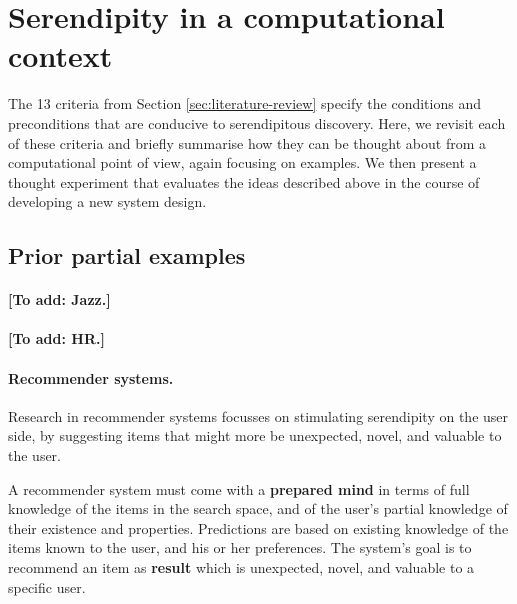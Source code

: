 \section{Serendipity in a computational context} \label{sec:computational-serendipity}

The 13 criteria from Section \ref{sec:literature-review} specify the
conditions and preconditions that are conducive to serendipitous
discovery.  Here, we revisit each of these criteria and briefly
summarise how they can be thought about from a computational point of
view, again focusing on examples.  We then present a thought
experiment that evaluates the ideas described above in the course of
developing a new system design.

% 

\subsection{Prior partial examples}

\paragraph{{[}To add: Jazz.{]}}

\paragraph{{[}To add: HR.{]}}

\paragraph{Recommender systems.} Research in recommender systems focusses on stimulating serendipity on the user side, by suggesting items that might more be unexpected, novel, and valuable to the user. 

A recommender system must come with a \textbf{prepared mind} in terms of full knowledge of the items in the search space, and of the user's partial knowledge of their existence and properties. Predictions are based on existing knowledge of the items known to the user, and his or her preferences. The system's goal is to recommend an item as \textbf{result} which is unexpected, novel, and valuable to a specific user. %

